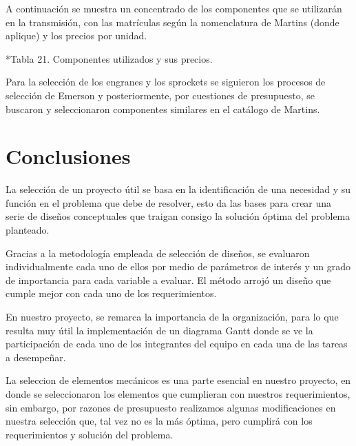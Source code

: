 A continuación se muestra un concentrado de los componentes que se utilizarán en la transmisión, con las matrículas según la nomenclatura de Martins (donde aplique) y los precios por unidad.

*Tabla 21. Componentes utilizados y sus precios.

Para la selección de los engranes y los sprockets se siguieron los procesos de selección de Emerson y posteriormente, por cuestiones de presupuesto, se buscaron y seleccionaron componentes similares en el catálogo de Martins. 

\section{Conclusiones}

La selección de un proyecto útil se basa en la identificación de una necesidad y su función en el problema que debe de resolver, esto da las bases para crear una serie de diseños conceptuales que traigan consigo la solución óptima del problema planteado.

Gracias a la metodología empleada de selección de diseños, se evaluaron individualmente cada uno de ellos por medio de parámetros de interés y un grado de importancia para cada variable a evaluar. El método arrojó un diseño que cumple mejor con cada uno de los requerimientos.

En nuestro proyecto, se remarca la importancia de la organización, para lo que resulta muy útil la implementación de un diagrama Gantt donde se ve la participación de cada uno de los integrantes del equipo en cada una de las tareas a desempeñar. 

La seleccion de elementos mecánicos es una parte esencial en nuestro proyecto, en donde se seleccionaron los elementos que cumplieran con nuestros requerimientos, sin embargo, por razones de presupuesto realizamos algunas modificaciones en nuestra selección que, tal vez no es la más óptima, pero cumplirá con los requerimientos y solución del problema.
